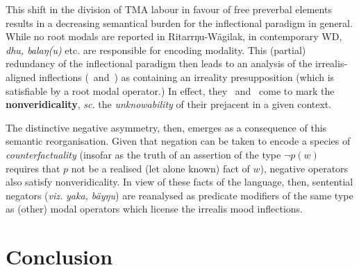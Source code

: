 This shift in the division of TMA labour in favour of free preverbal elements results in a decreasing semantical burden for the inflectional paradigm in general. While no root modals are reported in Ritarrŋu-Wägilak, in contemporary WD, \textit{dhu, balaŋ(u)} etc. are responsible for encoding modality. This (partial) redundancy of the inflectional paradigm then leads to an analysis of the irrealis-aligned inflections (\II~and~\IV) as containing an irreality presupposition (which is satisfiable by a root modal operator.) In effect, they \II~and \IV~come to mark the \textbf{nonveridicality}, \textit{sc.} the \textit{unknowability} of their prejacent in a given context.

The distinctive negative asymmetry, then, emerges as a consequence of this semantic reorganisation. Given that negation can be taken to encode a species of \textit{counterfactuality} (insofar as the truth of an assertion of the type $ \neg p(w) $ requires that $ p $ not be a realised (let alone known) fact of $ w $), negative operators also satisfy nonveridicality. In view of these facts of the language, then, sentential negators (\textit{viz. }\textit{yaka, bäyŋu}) are reanalysed as predicate modifiers of the same type as (other) modal operators which license the irrealis mood inflections.
\iffalse
\begin{itemize}
	
	\item Division of labour in WD : tendency towards reliance on explicit aspectual/modal operators
	\item cyclic tense: past and present reference are both marked with \I 
	\item imperfective marking becomes obligatory in WD for present reference (whereas in R-W, there's no aspect morphology --- i'm unsure if there's any way of distinguishing between e.g. pfv/ipfv in past predicatons.
	\item (partial) redundancy of inflections in WD --- presupposition/agreement phenomenon
	\item Unlike in R-W, WD \II/\IV~ are no longer doing modal work. \item They're analysed as containing an irreality presuppositioin
	\item Given that negation marks counterfactuality, it's reanalysed as predicate modifier like the other modal operators that licenses irrealis mood inflection.

\end{itemize}
\fi
\section{Conclusion}



